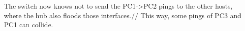 The switch now knows not to send the PC1->PC2 pings to the other hosts, where the hub also floods those interfaces.//
This way, some pings of PC3 and PC1 can collide.